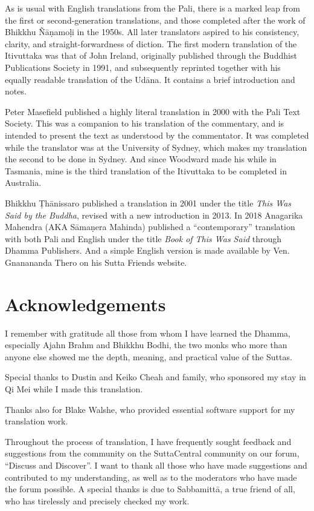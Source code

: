 \documentclass[12pt,openany]{book}%
\begin{document}
As is usual with English translations from the Pali, there is a marked leap from the first or second-generation translations, and those completed after the work of Bhikkhu \textsanskrit{Ñāṇamoḷi} in the 1950s. All later translators aspired to his consistency, clarity, and straight-forwardness of diction. The first modern translation of the Itivuttaka was that of John Ireland, originally published through the Buddhist Publications Society in 1991, and subsequently reprinted together with his equally readable translation of the \textsanskrit{Udāna}. It contains a brief introduction and notes.

Peter Masefield published a highly literal translation in 2000 with the Pali Text Society. This was a companion to his translation of the commentary, and is intended to present the text as understood by the commentator. It was completed while the translator was at the University of Sydney, which makes my translation the second to be done in Sydney. And since Woodward made his while in Tasmania, mine is the third translation of the Itivuttaka to be completed in Australia.

Bhikkhu \textsanskrit{Ṭhānissaro} published a translation in 2001 under the title \textit{This Was Said by the Buddha}, revised with a new introduction in 2013. In 2018 Anagarika Mahendra (AKA \textsanskrit{Sāmaṇera} Mahinda) published a “contemporary” translation with both Pali and English under the title \textit{Book of This Was Said} through Dhamma Publishers. And a simple English version is made available by Ven. Gnanananda Thero on his Sutta Friends website.

%
\chapter*{Acknowledgements}

I remember with gratitude all those from whom I have learned the Dhamma, especially Ajahn Brahm and Bhikkhu Bodhi, the two monks who more than anyone else showed me the depth, meaning, and practical value of the Suttas.

Special thanks to Dustin and Keiko Cheah and family, who sponsored my stay in Qi Mei while I made this translation.

Thanks also for Blake Walshe, who provided essential software support for my translation work.

Throughout the process of translation, I have frequently sought feedback and suggestions from the community on the SuttaCentral community on our forum, “Discuss and Discover”. I want to thank all those who have made suggestions and contributed to my understanding, as well as to the moderators who have made the forum possible. A special thanks is due to \textsanskrit{Sabbamittā}, a true friend of all, who has tirelessly and precisely checked my work.
\end{document}
